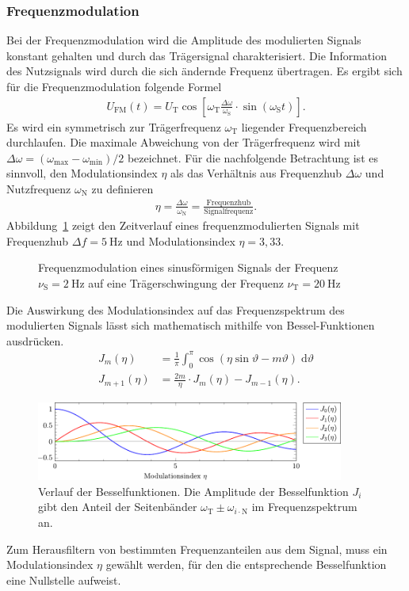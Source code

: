 \documentclass[a4paper,twoside,final]{article}
\begin{document}
\subsubsection{Frequenzmodulation}
Bei der Frequenzmodulation wird die Amplitude des modulierten Signals konstant gehalten und durch das Trägersignal charakterisiert. Die Information des Nutzsignals wird durch die sich ändernde Frequenz übertragen. Es ergibt sich für die Frequenzmodulation folgende Formel
\begin{align}
  U_\text{FM}(t) = U_\text{T} \cos\left[\omega_\text{T} \frac{\Delta \omega}{\omega_\text{S}}\cdot \sin(\omega_\text{S}t)\right].
\end{align}
Es wird ein symmetrisch zur Trägerfrequenz $\omega_\text{T}$ liegender Frequenzbereich durchlaufen. Die maximale Abweichung von der Trägerfrequenz wird mit $\Delta \omega = (\omega_\text{max}-\omega_\text{min})/2$ bezeichnet. Für die nachfolgende Betrachtung ist es sinnvoll, den Modulationsindex $\eta$ als das Verhältnis aus Frequenzhub $\Delta \omega$ und Nutzfrequenz $\omega_\text{N}$ zu definieren
\begin{align}
  \eta = \frac{\Delta \omega}{\omega_\text{N}} = \frac{\text{Frequenzhub}}{\text{Signalfrequenz}}.
\end{align}
Abbildung~\ref{fig:FM} zeigt den Zeitverlauf eines frequenzmodulierten Signals mit Frequenzhub $\Delta f = \SI{5}{\hertz}$ und Modulationsindex $\eta = 3,33$.
\begin{figure}[htp]
    \centering
        
    \caption{Frequenzmodulation eines sinusförmigen Signals der Frequenz $\nu_\text{S} = \SI{2}{\hertz}$ auf eine Trägerschwingung der Frequenz $\nu_\text{T} = \SI{20}{\hertz}$}
    \label{fig:FM}
\end{figure}
\FloatBarrier
\noindent
Die Auswirkung des Modulationsindex auf das Frequenzspektrum des modulierten Signals lässt sich mathematisch mithilfe von Bessel-Funktionen ausdrücken.
\begin{align}
    J_m(\eta) &= \frac{1}{\pi}\int_0^\pi \cos(\eta\sin \vartheta - m\vartheta)\; \text{d}\vartheta\\
    J_{m+1} (\eta) &= \frac{2m}{\eta} \cdot J_m(\eta) - J_{m-1}(\eta).
\end{align}
\begin{figure}[htp]
    \centering
    \includegraphics[width=0.9\textwidth]{Schaltungen/Besselfunktion.pdf}
    \caption{Verlauf der Besselfunktionen. Die Amplitude der Besselfunktion $J_i$ gibt den Anteil der Seitenbänder $\omega_\text{T}\pm\omega_{i\cdot\text{N}}$ im Frequenzspektrum an.}
    \label{fig:Besselfunktionen}
\end{figure}
Zum Herausfiltern von bestimmten Frequenzanteilen aus dem Signal, muss ein Modulationsindex $\eta$ gewählt werden, für den die entsprechende Besselfunktion eine Nullstelle aufweist.
\newpage
\end{document}
